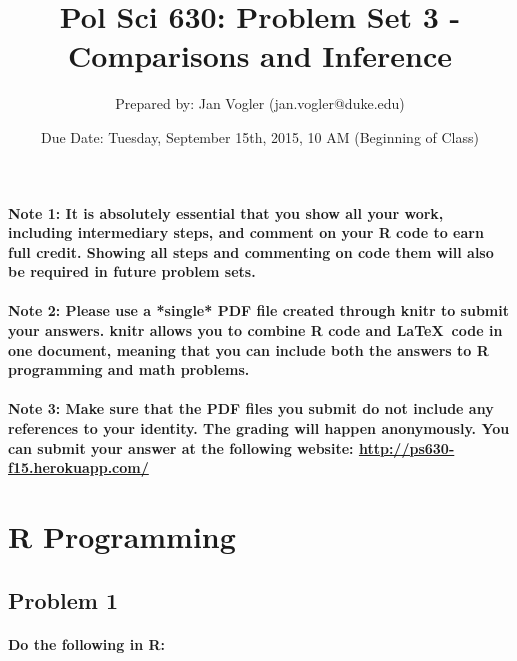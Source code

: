 \documentclass[12pt,letter]{article}
\begin{document}
\title{Pol Sci 630: Problem Set 3 - Comparisons and Inference}

\author{Prepared by: Jan Vogler (jan.vogler@duke.edu)}

\date{Due Date: Tuesday, September 15th, 2015, 10 AM (Beginning of Class)}
 
\maketitle 



\paragraph{Note 1: It is absolutely essential that you show all your work, including intermediary steps, and comment on your R code to earn full credit. Showing all steps and commenting on code them will also be required in future problem sets.}

\paragraph{Note 2: Please use a *single* PDF file created through knitr to submit your answers. knitr allows you to combine R code and \LaTeX \ code in one document, meaning that you can include both the answers to R programming and math problems.}

\paragraph{Note 3: Make sure that the PDF files you submit do not include any references to your identity. The grading will happen anonymously. You can submit your answer at the following website: \url{http://ps630-f15.herokuapp.com/}}



\section*{R Programming}

\subsection*{Problem 1}

\paragraph{Do the following in R:}
\end{document}
